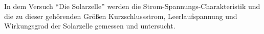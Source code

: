 In dem Versuch \enquote{Die Solarzelle} werden die Strom-Spannungs-Charakteristik
und die zu dieser gehörenden Größen Kurzschlussstrom, Leerlaufspannung und 
Wirkungsgrad der Solarzelle gemessen und untersucht. 